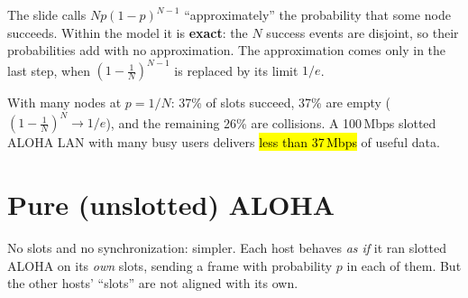 \begin{pitfall}
The slide calls $Np(1-p)^{N-1}$ ``approximately'' the probability that some node succeeds. Within the model it is \textbf{exact}: the $N$ success events are
disjoint, so their probabilities add with no approximation. The approximation comes only in the last step, when $(1-\frac1N)^{N-1}$ is replaced by its limit $1/e$.
\end{pitfall}

\begin{center}
\end{center}

\begin{example}
With many nodes at $p=1/N$: 37\% of slots succeed, 37\% are empty ($(1-\frac1N)^N\to1/e$), and the remaining 26\% are collisions.
A 100\,Mbps slotted ALOHA LAN with many busy users delivers \hl{less than 37\,Mbps} of useful data.
\end{example}

\section{Pure (unslotted) ALOHA}

\begin{defn}
No slots and no synchronization: simpler. Each host behaves \emph{as if} it ran slotted ALOHA on its \emph{own} slots, sending a frame with probability $p$ in
each of them. But the other hosts' ``slots'' are not aligned with its own.
\end{defn}

